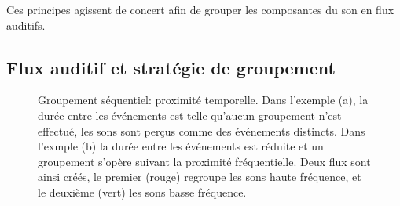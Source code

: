 Ces principes agissent de concert afin de grouper les composantes du son en flux auditifs.

\subsection{Flux auditif et stratégie de groupement}

\begin{figure}[bth]
        \myfloatalign
        \caption[Groupement séquentiel : proximité temporelle.]{Groupement séquentiel: proximité temporelle. Dans l'exemple (a), la durée entre les événements est telle qu'aucun groupement n'est effectué, les sons sont perçus comme des événements distincts. Dans l'exmple (b) la durée entre les événements est réduite et un groupement s'opère suivant la proximité fréquentielle. Deux flux sont ainsi créés, le premier (rouge) regroupe les sons haute fréquence, et le deuxième (vert) les sons basse fréquence.}\label{fig:tonesim}
\end{figure}

